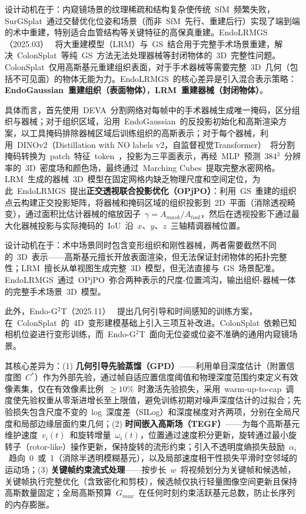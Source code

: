 设计动机在于：内窥镜场景的纹理稀疏和结构复杂使传统~SfM~频繁失败，SurGSplat~通过交替优化位姿和场景（而非~SfM~先行、重建后行）实现了端到端的术中重建，特别适合血管结构等关键特征的高保真重建。EndoLRMGS（2025.03）~\cite{2503_22437} 将大重建模型（LRM）与~GS~结合用于完整手术场景重建，解决~ColonSplat~等纯~GS~方法无法处理器械等封闭物体的~3D~完整性问题。ColonSplat~仅用高斯基元重建组织表面，对于手术器械等需要完整~3D~几何（包括不可见面）的物体无能为力。EndoLRMGS~的核心差异是引入混合表示策略：\textbf{EndoGaussian~重建组织（表面物体）}，\textbf{LRM~重建器械（封闭物体）}。

具体而言，首先使用~DEVA~分割网络对每帧中的手术器械生成唯一掩码，区分组织与器械；对于组织区域，沿用~EndoGaussian~的反投影初始化和高斯渲染方案，以工具掩码排除器械区域后训练组织的高斯表示；对于每个器械，利用~DINOv2（Distillation with NO labels v2，自监督视觉Transformer）~将分割掩码转换为~patch~特征~token~，投影为三平面表示，再经~MLP~预测~384$^3$~分辨率的~3D~密度场和颜色场，最终通过~Marching Cubes~提取完整水密网格。LRM~生成的器械~3D~模型在固定网格内缺乏物理尺度和空间定位，为此~EndoLRMGS~提出\textbf{正交透视联合投影优化（OPjPO）}：利用~GS~重建的组织点云构建正交投影矩阵，将器械和掩码区域的组织投影到~2D~平面（消除透视畸变），通过面积比估计器械的缩放因子~$\gamma = A_{mask}/A_{tool}$，然后在透视投影下通过最大化器械投影与实际掩码的~IoU~沿~$x$、$y$、$z$~三轴精调器械位置。

设计动机在于：术中场景同时包含变形组织和刚性器械，两者需要截然不同的~3D~表示——高斯基元擅长开放表面渲染，但无法保证封闭物体的拓扑完整性；LRM~擅长从单视图生成完整~3D~模型，但无法直接与~GS~场景配准。EndoLRMGS~通过~OPjPO~弥合两种表示的尺度-位置鸿沟，输出组织-器械一体的完整手术场景~3D~模型。

此外，Endo-G$^{2}$T（2025.11）~\cite{2511_21367} 提出几何引导和时间感知的训练方案，在~ColonSplat~的~4D~变形建模基础上引入三项互补改进。ColonSplat~依赖已知相机位姿进行变形训练，而~Endo-G$^2$T~面向无位姿或位姿不准确的通用内窥镜场景。

其核心差异为：(1) \textbf{几何引导先验蒸馏（GPD）}——利用单目深度估计（附置信度图~$C^*$）作为外部先验，通过帧自适应置信度阈值和物理深度范围约束定义有效像素集，仅在有效像素比例~$\geq 10\%$~时激活先验损失，采用~warm-up-to-cap~调度使先验权重从零渐进增长至上限值，避免训练初期对噪声深度估计的过拟合；先验损失包含尺度不变的~log~深度差（SILog）和深度梯度对齐两项，分别在全局尺度和局部边缘层面约束几何；(2) \textbf{时间嵌入高斯场（TEGF）}——为每个高斯基元维护速度~$v_i(t)$~和旋转增量~$\omega_i(t)$，位置通过速度积分更新，旋转通过最小旋转子（rotor-like）操作更新，保持旋转的流形约束；引入不透明度熵损失鼓励~$\alpha_i$~趋向~0~或~1（消除半透明模糊基元），以及局部速度相干性损失平滑时空邻域的运动场；(3) \textbf{关键帧约束流式处理}——按步长~$w$~将视频划分为关键帧和候选帧，关键帧执行完整优化（含致密化和剪枝），候选帧仅执行轻量图像空间更新且保持高斯数量固定；全局高斯预算~$G_{max}$~在任何时刻约束活跃基元总数，防止长序列的内存膨胀。

